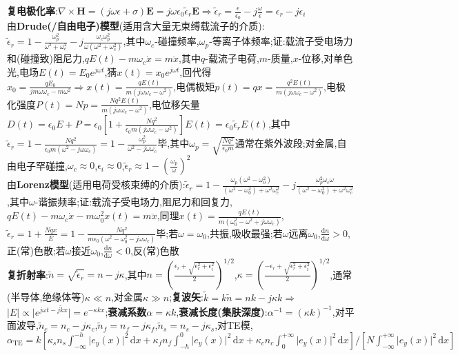 \documentclass[a4paper,10pt]{article}
\providecommand{\abs}[1]{\lvert#1\rvert}
\begin{document}
\begin{multicols*}{2}
\textbf{复电极化率}:$\nabla\times\bm{H}=(j\omega\epsilon+\sigma)\bm{E}=j\omega\epsilon_0\tilde{\epsilon}_r\bm{E}\Rightarrow\tilde{\epsilon}_{r}=\frac{\epsilon}{\epsilon_0}-j\frac{\omega}{\epsilon}=\epsilon_r-j\epsilon_i$\\
由\textbf{Drude(/自由电子)模型}(适用含大量无束缚载流子的介质):$\tilde{\epsilon}_r=1-\frac{\omega_p^2}{\omega^2+\omega_c^2}-j\frac{\omega_c\omega_p^2}{\omega(\omega^2+\omega_c^2)}$,其中$\omega_c$-碰撞频率,$\omega_p$-等离子体频率;证:载流子受电场力和(碰撞致)阻尼力,$qE(t)-m\omega_c\dot{x}=m\ddot{x}$,其中$q$-载流子电荷,$m$-质量,$x$-位移,对单色光,电场$E(t)=E_0e^{j\omega t}$,猜$x(t)=x_0e^{j\omega t}$,回代得$x_0=\frac{qE_0}{jm\omega\omega_c-m\omega^2}\Rightarrow x(t)=\frac{qE(t)}{m(j\omega\omega_c-\omega^2)}$,电偶极矩$p(t)=qx=\frac{q^2E(t)}{m(j\omega\omega_c-\omega^2)}$,电极化强度$P(t)=Np=\frac{Nq^2E(t)}{m(j\omega\omega_c-\omega^2)}$,电位移矢量$D(t)=\epsilon_0E+P=\epsilon_0[1+\frac{Nq^2}{\epsilon_0m(j\omega\omega_c-\omega^2)}]E(t)=\epsilon_0\tilde{\epsilon}_rE(t)$,其中$\tilde{\epsilon}_r=1-\frac{Nq^2}{\epsilon_0m(\omega^2-j\omega\omega_c)}=1-\frac{\omega_p^2}{\omega^2-j\omega\omega_c}$毕,其中$\omega_p=\sqrt{\frac{Nq^2}{\epsilon_0m}}$通常在紫外波段;对金属,自由电子罕碰撞,$\omega_c\approx 0$,$\epsilon_i\approx 0$,$\tilde{\epsilon}_r\approx 1-(\frac{\omega_p}{\omega})^2$\\
由\textbf{Lorenz模型}(适用电荷受核束缚的介质):$\tilde{\epsilon}_r=1-\frac{\omega_p(\omega^2-\omega_0^2)}{(\omega^2-\omega_0^2)+\omega^2\omega_c^2}-j\frac{\omega_p^2\omega_c\omega}{(\omega^2-\omega_0^2)+\omega^2\omega_c^2}$,其中$\omega$-谐振频率;证:载流子受电场力,阻尼力和回复力,$qE(t)-m\omega_c\dot{x}-m\omega_0^2x(t)=m\ddot{x}$,同理$x(t)=\frac{qE(t)}{m(\omega_0^2-\omega^2+j\omega\omega_c)}$,$\tilde{\epsilon}_r=1+\frac{Nqx}{E}=1-\frac{Nq^2}{m\epsilon_0(\omega^2-\omega_0^2-j\omega\omega_c)}$毕;若$\omega=\omega_0$,共振,吸收最强;若$\omega$远离$\omega_0$,$\frac{\mathrm{d}n}{\mathrm{d}\omega}>0$,正(常)色散;若$\omega$接近$\omega_0$,$\frac{\mathrm{d}n}{\mathrm{d}\omega}<0$,反(常)色散\\ %
\textbf{复折射率}:$\tilde{n}=\sqrt{\tilde{\epsilon}_r}=n-j\kappa$,其中$n=(\frac{\epsilon_r+\sqrt{\epsilon_r^2+\epsilon_i^2}}{2})^{1/2}$,$\kappa=(\frac{-\epsilon_r+\sqrt{\epsilon_r^2+\epsilon_i^2}}{2})^{1/2}$,通常(半导体,绝缘体等)$\kappa\ll n$,对金属$\kappa\gg n$;\textbf{复波矢}:$\tilde{k}=k\tilde{n}=nk-j\kappa k\Rightarrow$$\abs{E}\propto\abs{e^{j\omega t-j\tilde{k}x}}=e^{-\kappa kx}$;\textbf{衰减系数}$\alpha=\kappa k$,\textbf{衰减长度(集肤深度)}:$\alpha^{-1}=(\kappa k)^{-1}$,对平面波导,$\tilde{n}_c=n_c-j\kappa_c$,$\tilde{n}_f=n_f-j\kappa_f$,$\tilde{n}_s=n_s-j\kappa_s$,对TE模,$\alpha_{\text{TE}}=k[\kappa_sn_s\int_{-\infty}^{-h}\abs{e_y(x)}^2\,\mathrm{d}x+\kappa_fn_f\int_{-h}^0\abs{e_y(x)}^2\,\mathrm{d}x+\kappa_cn_c\int_0^{+\infty}\abs{e_y(x)}^2\,\mathrm{d}x]/[N\int_{-\infty}^{+\infty}\abs{e_y(x)}^2\,\mathrm{d}x]$\\
$$
\end{multicols*}
\end{document}
